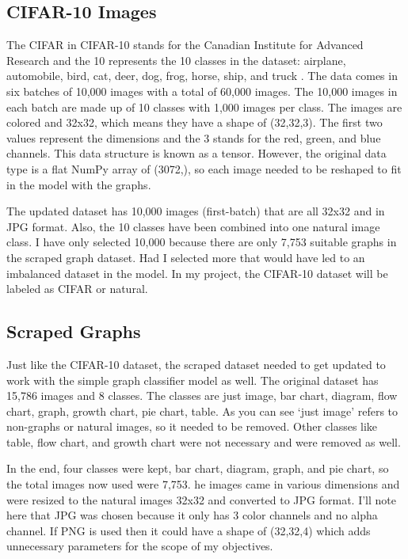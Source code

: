 \documentclass[12pt]{article}
\begin{document}
        \subsection{CIFAR-10 Images}
    
            The CIFAR in CIFAR-10 stands for the Canadian Institute for Advanced Research and the 10 represents the 10 classes in the dataset: 
            airplane, automobile, bird, cat, deer, dog, frog, horse, ship, and truck \cite{krizhevsky2009}. 
            The data comes in six batches of 10,000 images with a total of 60,000 images. 
            The 10,000 images in each batch are made up of 10 classes with 1,000 images per class. 
            The images are colored and 32x32, which means they have a shape of (32,32,3). 
            The first two values represent the dimensions and the 3 stands for the red, green, and blue channels. 
            This data structure is known as a tensor. However, the original data type is a flat NumPy array of (3072,), 
            so each image needed to be reshaped to fit in the model with the graphs.

            The updated dataset has 10,000 images (first-batch) that are all 32x32 and in JPG format. 
            Also, the 10 classes have been combined into one natural image class. 
            I have only selected 10,000 because there are only 7,753 suitable graphs in the scraped graph dataset. 
            Had I selected more that would have led to an imbalanced dataset in the model. 
            In my project, the CIFAR-10 dataset will be labeled as CIFAR or natural.
        
            
        \subsection{Scraped Graphs}
    
            Just like the CIFAR-10 dataset, the scraped dataset \cite{sunedition2021} needed to get updated to work 
            with the simple graph classifier model as well. The original dataset has 15,786 images and 8 classes. 
            The classes are just image, bar chart, diagram, flow chart, graph, growth chart, pie chart, table. 
            As you can see ‘just image’ refers to non-graphs or natural images, so it needed to be removed. 
            Other classes like table, flow chart, and growth chart were not necessary and were removed as well.

            In the end, four classes were kept, bar chart, diagram, graph, and pie chart, 
            so the total images now used were 7,753. 
            he images came in various dimensions and were resized to the natural images 32x32 and converted to JPG format. 
            I’ll note here that JPG was chosen because it only has 3 color channels and no alpha channel. 
            If PNG is used then it could have a shape of (32,32,4) which adds unnecessary parameters for the scope of my objectives.
        
\end{document}
